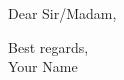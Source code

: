 \documentclass{letter}
\newcommand{\companyname}{Company Name}
\begin{document}
\begin{letter}{}
    \opening{Dear Sir/Madam,}


    \closing{Best regards,\\Your Name}
\end{letter}
\end{document}
